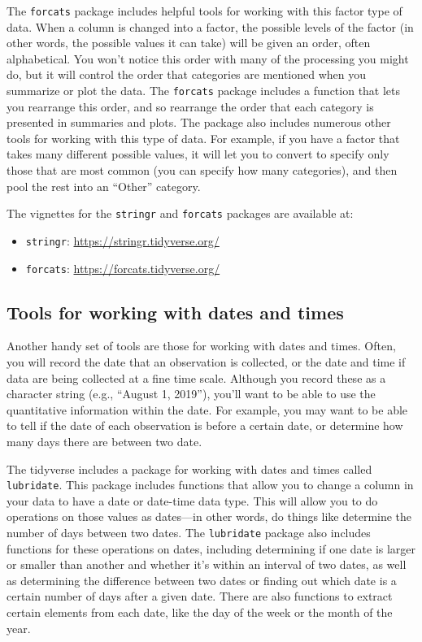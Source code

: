 \documentclass[]{tufte-book}
\providecommand{\tightlist}{%
  \setlength{\itemsep}{0pt}\setlength{\parskip}{0pt}}
\begin{document}
The \texttt{forcats} package includes helpful tools for working with this factor type
of data. When a column is changed into a factor, the possible levels of the
factor (in other words, the possible values it can take) will be given an order,
often alphabetical. You won't notice this order with many of the processing
you might do, but it will control the order that categories are mentioned when
you summarize or plot the data. The \texttt{forcats} package includes a function that
lets you rearrange this order, and so rearrange the order that each category
is presented in summaries and plots. The package also includes numerous other
tools for working with this type of data. For example, if you have a factor
that takes many different possible values, it will let you to convert to
specify only those that are most common (you can specify how many categories),
and then pool the rest into an ``Other'' category.

The vignettes for the \texttt{stringr} and \texttt{forcats} packages are available at:

\begin{itemize}
\tightlist
\item
  \texttt{stringr}: \url{https://stringr.tidyverse.org/}
\item
  \texttt{forcats}: \url{https://forcats.tidyverse.org/}
\end{itemize}

\subsection{Tools for working with dates and times}\label{tools-for-working-with-dates-and-times}

Another handy set of tools are those for working with dates and times. Often, you
will record the date that an observation is collected, or the date and time if
data are being collected at a fine time scale. Although you record these as a
character string (e.g., ``August 1, 2019''), you'll want to be able to use the
quantitative information within the date. For example, you may want to be able
to tell if the date of each observation is before a certain date, or determine
how many days there are between two date.

The tidyverse includes a package for working with dates and times called
\texttt{lubridate}. This package includes functions that allow you to change a column
in your data to have a date or date-time data type. This will allow you to
do operations on those values as dates---in other words, do things like determine
the number of days between two dates. The \texttt{lubridate} package also includes
functions for these operations on dates, including determining if one date is
larger or smaller than another and whether it's within an interval of two dates,
as well as determining the difference between two dates or finding out which
date is a certain number of days after a given date. There are also functions
to extract certain elements from each date, like the day of the week or the
month of the year.
\end{document}
